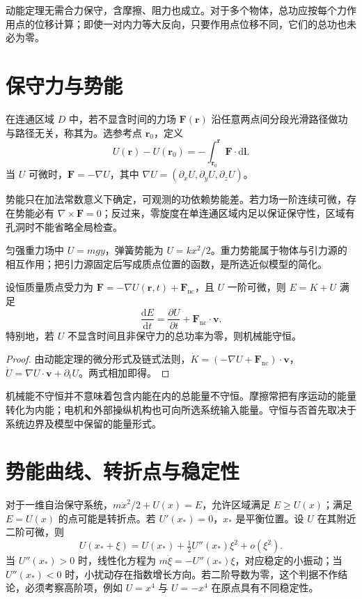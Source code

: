 \documentclass[UTF8,12pt,a4paper,fontset=fandol]{ctexbook}
\begin{document}
动能定理无需合力保守，含摩擦、阻力也成立。对于多个物体，总功应按每个力作用点的位移计算；即使一对内力等大反向，只要作用点位移不同，它们的总功也未必为零。

\section{保守力与势能}
\begin{definition}[保守力和势能]
在连通区域 $D$ 中，若不显含时间的力场 $\mathbf F(\mathbf r)$ 沿任意两点间分段光滑路径做功与路径无关，称其为。选参考点 $\mathbf r_0$，定义
\[
 U(\mathbf r)-U(\mathbf r_0)=-\int_{\mathbf r_0}^{\mathbf r}\mathbf F\cdot\mathrm d\mathbf l.
\]
当 $U$ 可微时，$\mathbf F=-\nabla U$，其中 $\nabla U=(\partial_xU,\partial_yU,\partial_zU)$。
\end{definition}
势能只在加法常数意义下确定，可观测的功依赖势能差。若力场一阶连续可微，存在势能必有 $\nabla\times\mathbf F=0$；反过来，零旋度在单连通区域内足以保证保守性，区域有孔洞时不能省略全局检查。

匀强重力场中 $U=mgy$，弹簧势能为 $U=kx^2/2$。重力势能属于物体与引力源的相互作用；把引力源固定后写成质点位置的函数，是所选近似模型的简化。

\begin{proposition}[机械能变化]
设恒质量质点受力为 $\mathbf F=-\nabla U(\mathbf r,t)+\mathbf F_{\mathrm{nc}}$，且 $U$ 一阶可微，则 $E=K+U$ 满足
\begin{equation}
 \frac{\mathrm dE}{\mathrm dt}=\frac{\partial U}{\partial t}+\mathbf F_{\mathrm{nc}}\cdot\mathbf v.
 \label{eq:mech-energy-rate}
\end{equation}
特别地，若 $U$ 不显含时间且非保守力的总功率为零，则机械能守恒。
\end{proposition}
\begin{proof}
由动能定理的微分形式及链式法则，$\dot K=(-\nabla U+\mathbf F_{\mathrm{nc}})\cdot\mathbf v$，$\dot U=\nabla U\cdot\mathbf v+\partial_tU$。两式相加即得。
\end{proof}

机械能不守恒并不意味着包含内能在内的总能量不守恒。摩擦常把有序运动的能量转化为内能；电机和外部操纵机构也可向所选系统输入能量。守恒与否首先取决于系统边界及模型中保留的能量形式。

\section{势能曲线、转折点与稳定性}
对于一维自治保守系统，$m\dot x^2/2+U(x)=E$，允许区域满足 $E\ge U(x)$；满足 $E=U(x)$ 的点可能是转折点。若 $U'(x_*)=0$，$x_*$ 是平衡位置。设 $U$ 在其附近二阶可微，则
\[
 U(x_*+\xi)=U(x_*)+\tfrac12U''(x_*)\xi^2+o(\xi^2).
\]
当 $U''(x_*)>0$ 时，线性化方程为 $m\ddot\xi=-U''(x_*)\xi$，对应稳定的小振动；当 $U''(x_*)<0$ 时，小扰动存在指数增长方向。若二阶导数为零，这个判据不作结论，必须考察高阶项，例如 $U=x^4$ 与 $U=-x^4$ 在原点具有不同稳定性。
\end{document}
